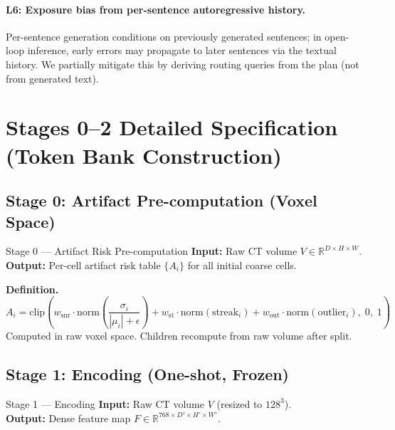 \documentclass[11pt,a4paper]{article}
\newcommand{\RR}{\mathbb{R}}
\newcommand{\clip}{\mathrm{clip}}
\begin{document}
\paragraph{L6: Exposure bias from per-sentence autoregressive history.}
Per-sentence generation conditions on previously generated sentences; in open-loop inference, early errors may propagate to later sentences via the textual history.
We partially mitigate this by deriving routing queries from the plan (not from generated text).


\appendix
\section{Stages 0--2 Detailed Specification (Token Bank Construction)}
\label{app:stage0-2}

\subsection{Stage 0: Artifact Pre-computation (Voxel Space)}

\begin{stagebox}{Stage 0 --- Artifact Risk Pre-computation}
\textcolor{inputcolor}{\textbf{Input:}} Raw CT volume $V \in \RR^{D\times H\times W}$.\\
\textcolor{outputcolor}{\textbf{Output:}} Per-cell artifact risk table $\{A_i\}$ for all initial coarse cells.
\end{stagebox}

\textbf{Definition.}
\begin{equation}
A_i = \clip\!\left(
    w_{\mathrm{snr}} \cdot \mathrm{norm}\!\left(\frac{\sigma_i}{|\mu_i|+\epsilon}\right)
    + w_{\mathrm{st}} \cdot \mathrm{norm}(\mathrm{streak}_i)
    + w_{\mathrm{out}} \cdot \mathrm{norm}(\mathrm{outlier}_i),\;
    0,\; 1
\right)
\label{eq:artifact}
\end{equation}
Computed in raw voxel space. Children recompute from raw volume after split.

\subsection{Stage 1: Encoding (One-shot, Frozen)}

\begin{stagebox}{Stage 1 --- Encoding}
\textcolor{inputcolor}{\textbf{Input:}} Raw CT volume $V$ (resized to $128^3$).\\
\textcolor{outputcolor}{\textbf{Output:}} Dense feature map $F \in \RR^{768 \times D' \times H' \times W'}$.
\end{stagebox}
\end{document}
